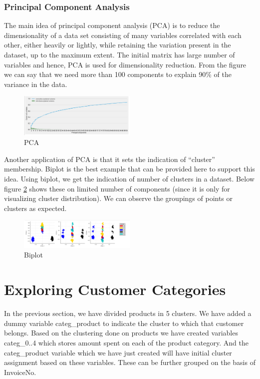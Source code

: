 \subsubsection{Principal Component Analysis}

The main idea of principal component analysis (PCA) is to reduce the dimensionality of a data set consisting of many variables correlated with each other, either heavily or lightly, while retaining the variation present in the dataset, up to the maximum extent. The initial matrix has large number of variables and hence, PCA is used for dimensionality reduction. From the figure we can say that we need more than 100 components to explain 90\% of the variance in the data.\\

\begin{figure}[H]
\caption{PCA}
\label{3.5}
\centering
\includegraphics[width=0.5\textwidth]{images/3_5.PNG}
\end{figure}

Another application of PCA is that it sets the indication of “cluster” membership. Biplot is the best example that can be provided here to support this idea. Using biplot, we get the indication of number of clusters in a dataset. Below figure \ref{3.6} shows these on limited number of components (since it is only for visualizing cluster distribution). We can observe the groupings of points or clusters as expected.\\

\begin{figure}[H]
\caption{Biplot}
\label{3.6}
\centering
\includegraphics[width=0.5\textwidth]{images/3_6.PNG}
\end{figure}

\section*{Exploring Customer Categories}


In the previous section, we have divided products in 5 clusters. We have added a dummy variable categ\_product to indicate the cluster to which that customer belongs. Based on the clustering done on products we have created variables categ\_0..4 which stores amount spent on each of the product category. And the categ\_product variable which we have just created will have initial cluster assignment based on these variables. These can be further grouped on the basis of InvoiceNo.\\

